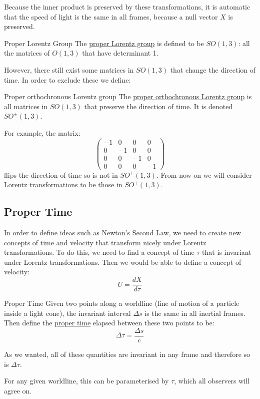 \documentclass[../Main.tex]{subfiles}
\begin{document}
Because the inner product is preserved by these transformations, it is automatic that the speed of light is the same in all frames, because a null vector $X$ is preserved.
\begin{definition}{Proper Lorentz Group}
    The \underline{proper Lorentz group} is defined to be $SO(1, 3)$: all the matrices of $O(1, 3)$ that have determinant 1.
\end{definition}
However, there still exist some matrices in $SO(1, 3)$ that change the direction of time. In order to exclude these we define:
\begin{definition}{Proper orthochronous Lorentz group}
    The \underline{proper orthochronous Lorentz group} is all matrices in $SO(1, 3)$ that preserve the direction of time. It is denoted $SO^+(1, 3)$.
\end{definition}
For example, the matrix:
\begin{equation*}
    \begin{pmatrix}
        -1 & 0 & 0 & 0 \\
        0 & -1 & 0 & 0 \\
        0 & 0 & -1 & 0 \\
        0 & 0 & 0 & -1
    \end{pmatrix}
\end{equation*}
flips the direction of time so is not in $SO^+(1, 3)$.
From now on we will consider Lorentz transformations to be those in $SO^+(1, 3)$.
\subsection{Proper Time}
In order to define ideas such as Newton's Second Law, we need to create new concepts of time and velocity that transform nicely under Lorentz transformations. To do this, we need to find a concept of time $\tau$ that is invariant under Lorentz transformations. Then we would be able to define a concept of velocity:
\begin{equation*}
    U = \frac{dX}{d\tau}
\end{equation*}
\begin{definition}{Proper Time}
    Given two points along a worldline (line of motion of a particle inside a light cone), the invariant interval $\Delta s$ is the same in all inertial frames. Then define the \underline{proper time} elapsed between these two points to be:
    \begin{equation*}
        \Delta \tau = \frac{\Delta s}{c}
    \end{equation*}
\end{definition}
\begin{remark}
    As we wanted, all of these quantities are invariant in any frame and therefore so is $\Delta \tau$.
\end{remark}
For any given worldline, this can be parameterised by $\tau$, which all observers will agree on.
\end{document}
